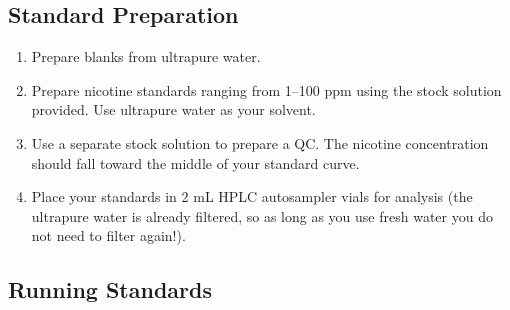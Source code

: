 \documentclass[]{tufte-book}
\providecommand{\tightlist}{%
  \setlength{\itemsep}{0pt}\setlength{\parskip}{0pt}}
\begin{document}
\hypertarget{standard-preparation-1}{%
\subsection{Standard Preparation}\label{standard-preparation-1}}

\begin{enumerate}
\def\labelenumi{\arabic{enumi}.}
\tightlist
\item
  Prepare blanks from ultrapure water.
\item
  Prepare nicotine standards ranging from 1--100 ppm using the stock solution provided. Use ultrapure water as your solvent.
\item
  Use a separate stock solution to prepare a QC. The nicotine concentration should fall toward the middle of your standard curve.
\item
  Place your standards in 2 mL HPLC autosampler vials for analysis (the ultrapure water is already filtered, so as long as you use fresh water you do not need to filter again!).
\end{enumerate}

\hypertarget{running-standards}{%
\subsection{Running Standards}\label{running-standards}}
\end{document}

